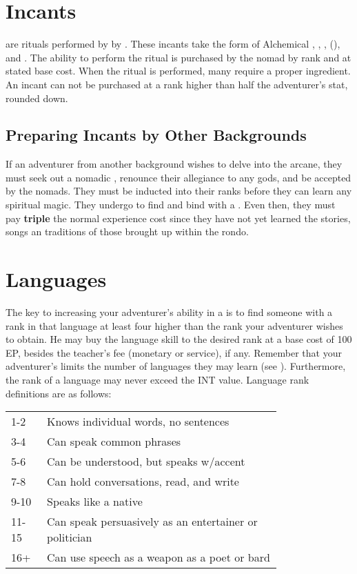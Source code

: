 \begin{multicols*}{2}
\section{Incants}
 are rituals performed by by . These
incants take the form of Alchemical , , ,  (), and . The ability to perform the ritual is purchased by the nomad by rank and at stated base cost. When the ritual is performed, many require a proper ingredient. An incant can not be purchased at a rank higher than half the adventurer's \PER stat, rounded down.
\subsection{Preparing Incants by Other Backgrounds}
If an adventurer from another background wishes to delve into the arcane, they must seek out a nomadic , renounce their allegiance to any gods, and be accepted by the nomads. They must be inducted into their ranks before they can learn any spiritual magic. They undergo  to find and bind with a . Even then, they must pay \textbf{triple} the normal experience cost since they have not yet learned the stories, songs an traditions of those brought up within the rondo.
\section{Languages}
The key to increasing your adventurer's ability in a  is to find someone with a rank in that language at least four higher than the rank your adventurer wishes to obtain. He may buy the language skill to the desired rank at a base cost of 100 EP, besides the teacher's fee (monetary or service), if any. Remember that your adventurer's \INT limits the number of languages they may learn (see \tcpage{\pageref{create-language}}). Furthermore, the rank of a language may never exceed the
INT value. Language rank definitions are as follows:

\begin{normbox}
\begin{tabular}{p{0.085\linewidth} p{0.7\linewidth}}
1-2  & Knows individual words, no sentences\\
3-4  & Can speak common phrases\\
5-6  & Can be understood, but speaks w/accent\\
7-8  & Can hold conversations, read, and write\\
9-10  & Speaks like a native\\
11-15  & Can speak persuasively as an entertainer or politician\\
16+ & Can use speech as a weapon as a poet or bard\\
\end{tabular}
\end{normbox}

\end{multicols*}
